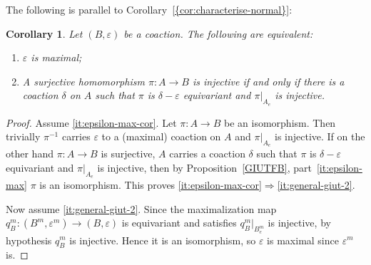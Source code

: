 \documentclass[12pt]{amsart}
\theoremstyle{plain}
\newtheorem{cor}[theorem]{Corollary}
\theoremstyle{remark}
\theoremstyle{definition}
\numberwithin{equation}{section}
\theoremstyle{plain}
\theoremstyle{definition}
\theoremstyle{remark}
\begin{document}
The following is parallel to {Corollary~\textup{\ref{{cor:characterise-normal}}}}:

\begin{cor}\label{cor:characterise-max} Let $(B, \varepsilon)$ be a coaction. The following are equivalent:
\begin{enumerate}
\item\label{it:epsilon-max-cor} $\varepsilon$ is maximal;
\item\label{it:general-giut-2} A surjective homomorphism $\pi:A\to B$ is injective if and only if there
is a coaction $\delta$ on $A$ such that $\pi$ is $\delta-\varepsilon$ equivariant and
$\pi\vert_{A_e}$ is injective.
\end{enumerate}
\end{cor}

\begin{proof}
Assume \eqref{it:epsilon-max-cor}. Let $\pi:A\to B$ be an isomorphism. Then trivially
$\pi{^{-1}}$ carries $\varepsilon$ to a (maximal) coaction on $A$ and
$\pi\vert_{A_e}$ is injective. If on the other hand $\pi:A\to B$ is surjective,
$A$ carries a coaction $\delta$ such that $\pi$ is $\delta-\varepsilon$ equivariant and $\pi\vert_{A_e}$ is injective,
then by Proposition~\ref{GIUTFB},
part~\eqref{it:epsilon-max} $\pi$ is an isomorphism. This proves \eqref{it:epsilon-max-cor}$\Rightarrow$\eqref{it:general-giut-2}.

Now assume \eqref{it:general-giut-2}. Since the maximalization map $q_B^m:(B^m, \varepsilon^m)\to (B, \varepsilon)$
is equivariant and satisfies $q_B^m\vert_{B^m_e}$ is injective, by hypothesis $q_B^m$ is injective. Hence it is an isomorphism,
so $\varepsilon$ is maximal since $\varepsilon^m$ is.
\end{proof}
\end{document}
